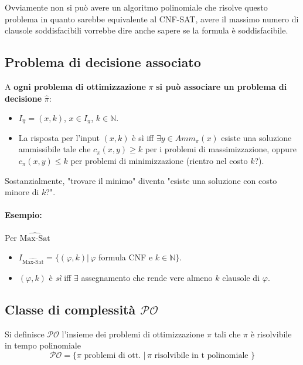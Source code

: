 Ovviamente non si può avere un algoritmo polinomiale che risolve questo problema in quanto sarebbe equivalente al CNF-SAT, avere il massimo numero di clausole soddisfacibili vorrebbe dire anche sapere se la formula è soddisfacibile.\\

\newpage

\subsection{Problema di decisione associato} 

A \textbf{ogni problema di ottimizzazione} $\pi$ \textbf{si può associare un problema di decisione} $\hat{\pi}$:
\begin{itemize}
	\item $I_{\hat{\pi}} = (x, k)$, $x \in I_\pi$, $k \in \mathbb{N}$.\\
	\item La risposta per l'input $(x,k)$ è sì iff $\exists y \in Amm_\pi (x)$ esiste una soluzione ammissibile tale che $c_\pi (x,y) \geq k$ per i problemi di massimizzazione, oppure $c_\pi (x,y) \leq k$ per problemi di minimizzazione (rientro nel costo $k$?).\\
\end{itemize}

Sostanzialmente, "trovare il minimo" diventa "esiste una soluzione con costo minore di $k$?".\\

\paragraph{Esempio:} Per $\hat{\text{Max-Sat}}$
\begin{itemize}
	\item $I_{\hat{\text{Max-Sat}}} = \{ (\varphi, k) | \, \varphi$ formula CNF e $k \in \mathbb{N} \}$.\\
	\item $(\varphi, k)$ è \textit{sì} iff $\exists$ assegnamento che rende vere almeno $k$ clausole di $\varphi$.\\
\end{itemize}

\newpage

\subsection{Classe di complessità $\mathcal{PO}$}
Si definisce $\mathcal{PO}$ l'insieme dei problemi di ottimizzazione $\pi$ tali che $\pi$ è risolvibile in tempo polinomiale
$$ \mathcal{PO} = \{\pi \text{ problemi di ott. } | \, \pi \text{ risolvibile in t polinomiale } \}$$

